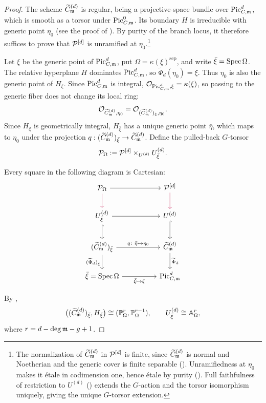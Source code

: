 \begin{proof}
The scheme $\Cmod{d}$ is regular, being
a projective-space bundle over $\PicCm[d]$, which is smooth as a torsor under
$\PicCm[0]$. Its boundary $H$ is irreducible with generic point $\eta_0$ (see
the proof of ). By purity
of the branch locus, it therefore suffices to prove that $\cP^{[d]}$ is
unramified at $\eta_0$.\footnote{The normalization of
$\Cmod{d}$ in $\cP^{[d]}$ is finite, since $\Cmod{d}$ is normal and
Noetherian and the generic cover is finite separable ().
Unramifiedness at $\eta_0$ makes it \'etale in
codimension one, hence \'etale by purity (). Full faithfulness
of restriction to $U^{(d)}$ () extends the $G$-action and
the torsor isomorphism uniquely, giving the unique $G$-torsor extension.}

Let $\xi$ be the generic point of $\PicCm[d]$, put
$\Omega=\kappa(\xi)^{\mathrm{sep}}$, and write $\bar\xi=\Spec\Omega$.
The relative hyperplane $H$ dominates $\PicCm[d]$, so
$\widetilde\Phi_d(\eta_0)=\xi$.
Thus $\eta_0$ is also the generic point of $H_\xi$. Since $\PicCm[d]$ is integral,
$\Oo_{\PicCm[d],\xi}=\kappa(\xi)$, so passing to the generic fiber does not
change its local ring:
\[
    \Oo_{\Cmod{d},\eta_0}=\Oo_{(\Cmod{d})_\xi,\eta_0}.
\]
Since $H_\xi$ is geometrically integral, $H_{\bar\xi}$ has a unique
generic point $\bar\eta$, which maps to
$\eta_0$ under the projection
$q:(\Cmod{d})_{\bar\xi}\to\Cmod{d}$.
Define the pulled-back $G$-torsor
\[
    \cP_\Omega:=\cP^{[d]}\times_{U^{(d)}}U^{(d)}_{\bar\xi}.
\]
\begin{samepage}
Every square in the following diagram is Cartesian:
\[
\begin{tikzcd}[column sep=huge, row sep=2em]
    \cP_\Omega \arrow[r] \arrow[d, purple]
      & \cP^{[d]} \arrow[d, purple] \\
    U^{(d)}_{\bar\xi} \arrow[r] \arrow[d, hook]
      & U^{(d)} \arrow[d, hook] \\
    (\Cmod{d})_{\bar\xi}
      \arrow[r, "q\colon\bar\eta\mapsto\eta_0"]
      \arrow[d, "(\widetilde\Phi_d)_{\bar\xi}"']
      & \Cmod{d} \arrow[d, "\widetilde\Phi_d"] \\
    \bar\xi=\Spec\Omega \arrow[r, "\bar\xi\mapsto\xi"']
      & \PicCm[d]
\end{tikzcd}
\]
\end{samepage}
By ,
\[
    \bigl((\Cmod{d})_{\bar\xi},H_{\bar\xi}\bigr)
    \cong(\mathbb P^r_\Omega,\mathbb P^{r-1}_\Omega),
    \qquad U^{(d)}_{\bar\xi}\cong\mathbb A^r_\Omega,
\]
where $r=d-\deg\mdls-g+1$.


\end{proof}
